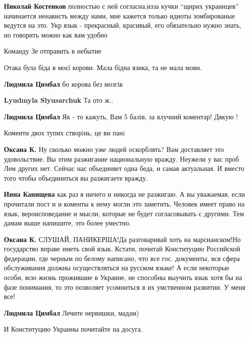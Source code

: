 \begin{itemize}
\begin{itemize}
 \textbf{Николай Костенков} полностью с ней согласна,изза
кучки \enquote{щирих украинцев} начинается ненависть между нами, мне кажется только
идиоты зомбированые ведутся на это. Укр язык - прекрасный, красивый, его
обязательно нужно знать, но говорить можно как вам удобно
\end{itemize}

Команду Зе отправить в небытие

Отака була біда в моєї корови. Мала бідна язика, та не мала мови.

\begin{itemize}

\textbf{Людмила Цимбал} бо корова без мозгів

\textbf{Lyudmyla Slyusarchuk} Та ото ж..

\textbf{Людмила Цимбал} Як - то кажуть, Вам 5 балів, за влучний коментар! Дякую !

Коменти двох тупих створiнь, це ви панi

\textbf{Оксана К.} Ну сколько можно уже людей оскорблять? Вам доставляет это
удовольствие. Вы этим разжигание национальную вражду. Неужели у вас проб Лем
других нет. Сейчас нас объединяет одна беда, и самая актуальная. И вместо того
чтобы объединиться вы разжигаете вражду.

\textbf{Инна Канищева} как раз я ничего и никогда не разжигаю. А вы уважаемая,
если прочитали пост и и коменты к нему могли это заметить. Человек имеет право
на язык, вероисповедание и мысли, которые не будет согласовывать с другими. Тем
дамам выше напишите, это более уместно.

\textbf{Оксана К.} СЛУШАЙ, ПАНИКЕРША!Да разговаривай хоть на марсианском!Но
государство вправе иметь свой язык. Кстати, почитай Конституцию Российской
федерации, где черным по белому написано, что все гос. документы, вся сфера
обслуживания должны осуществляться на русском языке! А если некоторые особи,
всю жизнь прожившие в Украине, не способны выучить язык хотя бы на фазе
понимания, то это позволяет усомниться в их умственном развитии. У меня все!

\textbf{Людмила Цимбал} Лечите нервишки, мадам)

И Конституцию Украины почитайте на досуга.


\end{itemize}
\end{itemize}
